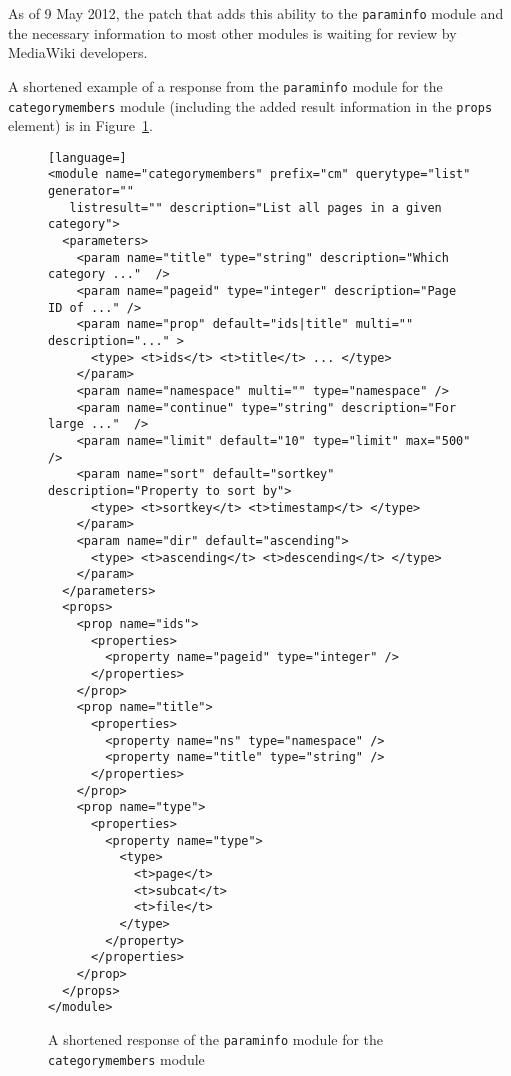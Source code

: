 As of 9 May 2012, the patch that adds this ability to the \texttt{paraminfo} module and the necessary
information to most other modules is waiting for review by MediaWiki developers.

A shortened example of a response from the \texttt{paraminfo} module
for the \texttt{categorymembers} module (including the added result information in the \texttt{props} element) is in Figure~\ref{paraminfo}.

\begin{figure}[htbp]

\begin{lstlisting}[language=]
<module name="categorymembers" prefix="cm" querytype="list" generator=""
   listresult="" description="List all pages in a given category">
  <parameters>
    <param name="title" type="string" description="Which category ..."  />
    <param name="pageid" type="integer" description="Page ID of ..." />
    <param name="prop" default="ids|title" multi="" description="..." >
      <type> <t>ids</t> <t>title</t> ... </type>
    </param>
    <param name="namespace" multi="" type="namespace" />
    <param name="continue" type="string" description="For large ..."  />
    <param name="limit" default="10" type="limit" max="500" />
    <param name="sort" default="sortkey" description="Property to sort by">
      <type> <t>sortkey</t> <t>timestamp</t> </type>
    </param>
    <param name="dir" default="ascending">
      <type> <t>ascending</t> <t>descending</t> </type>
    </param>
  </parameters>
  <props>
    <prop name="ids">
      <properties>
        <property name="pageid" type="integer" />
      </properties>
    </prop>
    <prop name="title">
      <properties>
        <property name="ns" type="namespace" />
        <property name="title" type="string" />
      </properties>
    </prop>
    <prop name="type">
      <properties>
        <property name="type">
          <type>
            <t>page</t>
            <t>subcat</t>
            <t>file</t>
          </type>
        </property>
      </properties>
    </prop>
  </props>
</module>
\end{lstlisting}

\caption{A shortened response of the \texttt{paraminfo} module for the \texttt{categorymembers} module}
\label{paraminfo}
\end{figure}